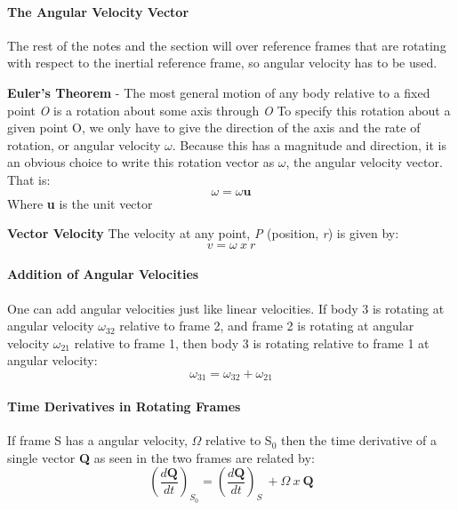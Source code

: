 \paragraph{The Angular Velocity Vector}
The rest of the notes and the section will over reference frames that are rotating with respect to the inertial reference frame, so angular velocity has to be used. 
\begin{defn}
\textbf{Euler's Theorem} - The most general motion of any body relative to a fixed point \textit{O} is a rotation about some axis through \textit{O} To specify this rotation about a given point O, we only have to give the direction of the axis and the rate of rotation, or angular velocity $\omega$. Because this has a magnitude and direction, it is an obvious choice to write this rotation vector as $\omega$, the angular velocity vector. That is:
\begin{equation}
\omega = \omega\textbf{u}
\end{equation}
Where \textbf{u} is the unit vector
\end{defn}
\begin{shaded}
\textbf{Vector Velocity}\newline
The velocity at any point, \textit{P} (position, \textit{r}) is given by:
\begin{equation}
v = \omega\  x \ r
\end{equation}
\end{shaded}
\paragraph*{Addition of Angular Velocities}
One can add angular velocities just like linear velocities. If body 3 is rotating at angular velocity $\omega_{32}$ relative to frame 2, and frame 2 is rotating at angular velocity $\omega_{21}$ relative to frame 1, then body 3 is rotating relative to frame 1 at angular velocity: 
\begin{equation}
\omega_{31} = \omega_{32} + \omega_{21}
\end{equation}
\paragraph{Time Derivatives in Rotating Frames}
If frame S has a angular velocity, $\Omega$ relative to S$_0$ then the time derivative of a single vector \textbf{Q} as seen in the two frames are related by:
\begin{equation}
(\frac{d\textbf{Q}}{dt})_{S_0} = (\frac{d\textbf{Q}}{dt})_{S} \ + \Omega \ x \ \textbf{Q}
\end{equation}
